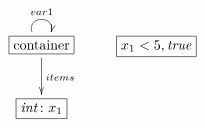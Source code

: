 $\xymatrix{
  \fbox{container} \ar@(ul, ur)^{var1} \ar[d]^{items} & \fbox{$x_1 < 5, \mathit{true}$} \\
  \fbox{$\mathit{int}\colon x_1$} &
}$
